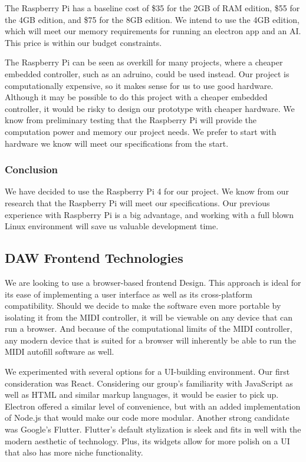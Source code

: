 The Raspberry Pi has a baseline cost of \$35 for the 2GB of RAM edition, \$55 for the 4GB
edition, and \$75 for the 8GB edition. We intend to use the 4GB edition, which will meet
our memory requirements for running an electron app and an AI. This price is within our
budget constraints.

The Raspberry Pi can be seen as overkill for many projects, where a cheaper embedded
controller, such as an adruino, could be used instead. Our project is computationally
expensive, so it makes sense for us to use good hardware. Although it may be possible to
do this project with a cheaper embedded controller, it would be risky to design our
prototype with cheaper hardware. We know from preliminary testing that the Raspberry Pi
will provide the computation power and memory our project needs. We prefer to start with
hardware we know will meet our specifications from the start.

\subsubsection{Conclusion}

We have decided to use the Raspberry Pi 4 for our project. We know from our research that
the Raspberry Pi will meet our specifications. Our previous experience with Raspberry Pi
is a big advantage, and working with a full blown Linux environment will save us valuable
development time.


\subsection{DAW Frontend Technologies}

We are looking to use a browser-based frontend Design. This approach is ideal for its ease
of implementing a user interface as well as its cross-platform compatibility. Should we
decide to make the software even more portable by isolating it from the MIDI controller,
it will be viewable on any device that can run a browser. And because of the computational
limits of the MIDI controller, any modern device that is suited for a browser will
inherently be able to run the MIDI autofill software as well.

We experimented with several options for a UI-building environment. Our first consideration was
React. Considering our group's familiarity with JavaScript as well as HTML and similar markup
languages, it would be easier to pick up. Electron offered a similar level of convenience, but with
an added implementation of Node.js that would make our code more modular. Another strong candidate
was Google's Flutter. Flutter's default stylization is sleek and fits in well with the modern
aesthetic of technology. Plus, its widgets allow for more polish on a UI that also has more niche
functionality.

